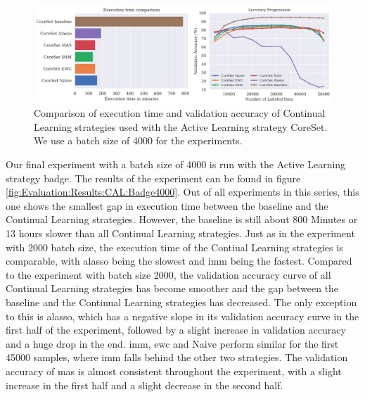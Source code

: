 \begin{figure}[h]
    \centering
    \includegraphics[width=\linewidth]{images/results_CAL/CoreSet_CAL_4000b.png}
    \caption[Continual Active Learning CoreSet 4000 batch size]{Comparison of execution time and validation accuracy of Continual Learning strategies used with the Active Learning strategy
    CoreSet. We use a batch size of 4000 for the experiments.}
    \label{fig:Evaluation:Results:CAL:CoreSet4000}
\end{figure}

Our final experiment with a batch size of 4000 is run with the Active Learning strategy \gls{badge}. The results of the experiment can be found in figure \ref{fig:Evaluation:Results:CAL:Badge4000}. Out of all experiments in this series, this one shows the
smallest gap in execution time between the baseline and the Continual Learning strategies. However, the baseline is still about 800 Minutes or 13 hours slower than all Continual Learning strategies. Just as in the experiment with 2000 batch size, the
execution time of the Contiual Learning strategies is comparable, with \gls{alasso} being the slowest and \gls{imm} being the fastest. Compared to the experiment with batch size 2000, the validation accuracy curve of all Continual Learning strategies has become smoother 
and the gap between the baseline and the Continual Learning strategies has decreased. The only exception to this is \gls{alasso}, which has a negative slope in its validation accuracy curve in the first half of the experiment, followed by a slight increase in 
validation accuracy and a huge drop in the end. \gls{imm}, \gls{ewc} and Naive perform similar for the first 45000 samples, where \gls{imm} falls behind the other two strategies. The validation accuracy of \gls{mas} is almost consistent throughout the experiment, with a slight
increase in the first half and a slight decrease in the second half. \par

